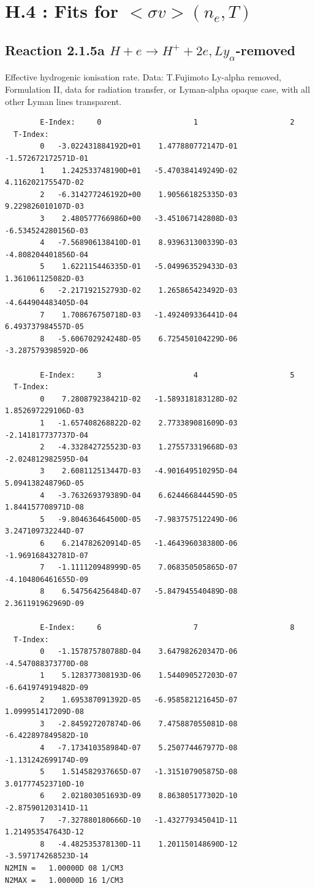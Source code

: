 \documentclass[12pt,dvipdfmx]{article}
\begin{document}
\section{H.4 :  Fits for $<\sigma v> (n_e,T)$}

\subsection{
Reaction 2.1.5a  $H + e \rightarrow H^+ + 2e, Ly_\alpha$-removed }

   Effective hydrogenic ionisation rate. Data: T.Fujimoto
   Ly-alpha removed, Formulation II, data for radiation transfer,
   or Lyman-alpha opaque case, with all other Lyman lines transparent.

\begin{small}\begin{verbatim}
        E-Index:     0                     1                     2
  T-Index:
        0   -3.022431884192D+01    1.477880772147D-01   -1.572672172571D-01
        1    1.242533748190D+01   -5.470384149249D-02    4.116202175547D-02
        2   -6.314277246192D+00    1.905661825335D-03    9.229826010107D-03
        3    2.480577766986D+00   -3.451067142808D-03   -6.534524280156D-03
        4   -7.568906138410D-01    8.939631300339D-03   -4.808204401856D-04
        5    1.622115446335D-01   -5.049963529433D-03    1.361061125082D-03
        6   -2.217192152793D-02    1.265865423492D-03   -4.644904483405D-04
        7    1.708676750718D-03   -1.492409336441D-04    6.493737984557D-05
        8   -5.606702924248D-05    6.725450104229D-06   -3.287579398592D-06

        E-Index:     3                     4                     5
  T-Index:
        0    7.280879238421D-02   -1.589318183128D-02    1.852697229106D-03
        1   -1.657408268822D-02    2.773389081609D-03   -2.141817737737D-04
        2   -4.332842725523D-03    1.275573319668D-03   -2.024812982595D-04
        3    2.608112513447D-03   -4.901649510295D-04    5.094138248796D-05
        4   -3.763269379389D-04    6.624466844459D-05    1.844157708971D-08
        5   -9.804636464500D-05   -7.983757512249D-06    3.247109732244D-07
        6    6.214782620914D-05   -1.464396038380D-06   -1.969168432781D-07
        7   -1.111120948999D-05    7.068350505865D-07   -4.104806461655D-09
        8    6.547564256484D-07   -5.847945540489D-08    2.361191962969D-09

        E-Index:     6                     7                     8
  T-Index:
        0   -1.157875780788D-04    3.647982620347D-06   -4.547088373770D-08
        1    5.128377308193D-06    1.544090527203D-07   -6.641974919482D-09
        2    1.695387091392D-05   -6.958582121645D-07    1.099951417209D-08
        3   -2.845927207874D-06    7.475887055081D-08   -6.422897849582D-10
        4   -7.173410358984D-07    5.250774467977D-08   -1.131242699174D-09
        5    1.514582937665D-07   -1.315107905875D-08    3.017774523710D-10
        6    2.021803051693D-09    8.863805177302D-10   -2.875901203141D-11
        7   -7.327880180666D-10   -1.432779345041D-11    1.214953547643D-12
        8   -4.482535378130D-11    1.201150148690D-12   -3.597174268523D-14
N2MIN =   1.00000D 08 1/CM3
N2MAX =   1.00000D 16 1/CM3


\end{verbatim}
\end{small}
\end{document}
